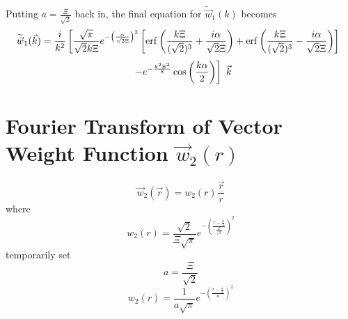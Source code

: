 \documentclass[double,12pt]{beavtex}
\begin{document}
Putting $a=\frac{\Xi}{\sqrt{2}}$ back in, the final equation for 
$\widetilde{\vec{w}}_1(k)$ becomes
\begin{equation}
   \widetilde{\vec{w}}_1(\vec{k})=\frac{i}{k^2}\left[\frac{\sqrt{\pi}}{\sqrt{2}k\Xi}
   e^{-\left(\frac{\alpha}{\sqrt{2}\Xi}\right)^2}\left[\operatorname{erf}
   \left(\frac{k\Xi}{(\sqrt{2})^3}+\frac{i\alpha}{\sqrt{2}\Xi}\right)
   +\operatorname{erf}\left(\frac{k\Xi}{(\sqrt{2})^3}-\frac{i\alpha}{\sqrt{2}\Xi}
   \right)\right]\color{white}\right]\color{black}  \nonumber
\end{equation}
\begin{equation}
   \color{white}\left[\color{black}-e^{-\frac{k^2\Xi^2}{8}}\cos\left(\frac{k\alpha}{2}\right)\right]{~}\color{black}\vec{k}
\end{equation}


\section{Fourier Transform of Vector Weight Function $\vec{w}_{2}(r)$}
\begin{equation}{\vec{w}_2(\vec{r})=w_2(r)\frac{\vec{r}}{r}}\end{equation}
where
\begin{equation}{w_2(r)=\frac{\sqrt{2}}{\Xi\sqrt{\pi}}e^{-\left(\frac{r-\frac{\alpha}{2}}{\frac{\Xi}{\sqrt{2}}}\right)^2}}\end{equation}
temporarily set 
\begin{equation}{a=\frac{\Xi}{\sqrt{2}}}\end{equation}
\begin{equation}{w_2(r)=\frac{1}{a\sqrt{\pi}}e^{-\left(\frac{r-\frac{\alpha}{2}}{a}\right)^2}}\end{equation}
\end{document}
